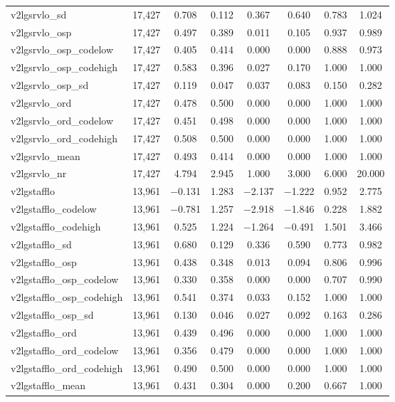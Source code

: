 \begin{table}[!htbp]
\begin{tabular}{@{\extracolsep{5pt}}lccccccc}
v2lgsrvlo\_sd & 17,427 & 0.708 & 0.112 & 0.367 & 0.640 & 0.783 & 1.024 \\ 
v2lgsrvlo\_osp & 17,427 & 0.497 & 0.389 & 0.011 & 0.105 & 0.937 & 0.989 \\ 
v2lgsrvlo\_osp\_codelow & 17,427 & 0.405 & 0.414 & 0.000 & 0.000 & 0.888 & 0.973 \\ 
v2lgsrvlo\_osp\_codehigh & 17,427 & 0.583 & 0.396 & 0.027 & 0.170 & 1.000 & 1.000 \\ 
v2lgsrvlo\_osp\_sd & 17,427 & 0.119 & 0.047 & 0.037 & 0.083 & 0.150 & 0.282 \\ 
v2lgsrvlo\_ord & 17,427 & 0.478 & 0.500 & 0.000 & 0.000 & 1.000 & 1.000 \\ 
v2lgsrvlo\_ord\_codelow & 17,427 & 0.451 & 0.498 & 0.000 & 0.000 & 1.000 & 1.000 \\ 
v2lgsrvlo\_ord\_codehigh & 17,427 & 0.508 & 0.500 & 0.000 & 0.000 & 1.000 & 1.000 \\ 
v2lgsrvlo\_mean & 17,427 & 0.493 & 0.414 & 0.000 & 0.000 & 1.000 & 1.000 \\ 
v2lgsrvlo\_nr & 17,427 & 4.794 & 2.945 & 1.000 & 3.000 & 6.000 & 20.000 \\ 
v2lgstafflo & 13,961 & $-$0.131 & 1.283 & $-$2.137 & $-$1.222 & 0.952 & 2.775 \\ 
v2lgstafflo\_codelow & 13,961 & $-$0.781 & 1.257 & $-$2.918 & $-$1.846 & 0.228 & 1.882 \\ 
v2lgstafflo\_codehigh & 13,961 & 0.525 & 1.224 & $-$1.264 & $-$0.491 & 1.501 & 3.466 \\ 
v2lgstafflo\_sd & 13,961 & 0.680 & 0.129 & 0.336 & 0.590 & 0.773 & 0.982 \\ 
v2lgstafflo\_osp & 13,961 & 0.438 & 0.348 & 0.013 & 0.094 & 0.806 & 0.996 \\ 
v2lgstafflo\_osp\_codelow & 13,961 & 0.330 & 0.358 & 0.000 & 0.000 & 0.707 & 0.990 \\ 
v2lgstafflo\_osp\_codehigh & 13,961 & 0.541 & 0.374 & 0.033 & 0.152 & 1.000 & 1.000 \\ 
v2lgstafflo\_osp\_sd & 13,961 & 0.130 & 0.046 & 0.027 & 0.092 & 0.163 & 0.286 \\ 
v2lgstafflo\_ord & 13,961 & 0.439 & 0.496 & 0.000 & 0.000 & 1.000 & 1.000 \\ 
v2lgstafflo\_ord\_codelow & 13,961 & 0.356 & 0.479 & 0.000 & 0.000 & 1.000 & 1.000 \\ 
v2lgstafflo\_ord\_codehigh & 13,961 & 0.490 & 0.500 & 0.000 & 0.000 & 1.000 & 1.000 \\ 
v2lgstafflo\_mean & 13,961 & 0.431 & 0.304 & 0.000 & 0.200 & 0.667 & 1.000 \\ 

\end{tabular}
\end{table}
